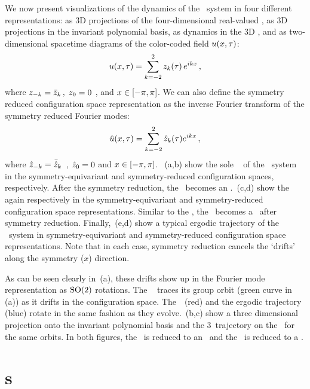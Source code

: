 \documentclass[aip,cha,
reprint,
secnumarabic,
nofootinbib, tightenlines,
nobibnotes, showkeys, showpacs,
superscriptaddress,
]{revtex4-1}
\begin{document}
We now present visualizations of the dynamics of the \twomode\ 
system in four different representations: as 3D projections of the 
four-dimensional real-valued \statesp, as 3D projections in the 
invariant polynomial basis, as dynamics in the 3D \slicePlane, 
and as two-dimensional spacetime diagrams of the color-coded field
$u(x,\tau)$:
\[
	u(x, \tau) = \sum_{k=-2}^{2} z_k(\tau) \, e^{i k x}
\,,
\]
where $z_{-k} = \bar{z}_k \,, \; 	z_0 = 0$ ,  and $x
\in [- \pi, \pi]$. We can also define the symmetry reduced configuration
space representation as the inverse Fourier transform of the symmetry
reduced Fourier modes:
\[
	\hat{u}(x, \tau) = \sum_{k=-2}^{2} \hat{z}_k(\tau) e^{i k x}
\,,
\]
where 
$\hat{z}_{-k} = \bar{\hat{z}}_k$ \,, \; 	
$\hat{z}_0 = 0$ \; 
and $x \in [- \pi, \pi]$. \,
(a,b) show the sole \reqv\ \REQV{}{} of the \twomode\ system in 
the symmetry-equivariant and symmetry-reduced configuration 
spaces, respectively. After the symmetry reduction, the \reqv\ 
becomes an \eqv. \,(c,d) show the \rpo\ 
 again respectively in the symmetry-equivariant and 
symmetry-reduced configuration space representations. Similar to 
the \reqv, the \rpo\ becomes a \po\ after symmetry reduction. 
Finally, \refFig{fig:2modes-conf}\,(e,d) show a typical ergodic 
trajectory of the \twomode\ system in symmetry-equivariant and 
symmetry-reduced configuration space representations. Note that in 
each case, symmetry reduction cancels the `drifts' along the 
symmetry ($x$) direction.

As can be seen clearly in \,(a), these 
drifts show up in the Fourier mode representation as $\textrm{SO}(2)$ 
rotations. The \reqv\ \REQV{}{} traces its  group orbit 
(green curve in \reffig{fig:2modes-ssp}\,(a)) as it drifts in the 
configuration space. The \rpo\ \cycle{01}\,(red) and the ergodic 
trajectory (blue) rotate in the same fashion as they evolve. 
\refFig{fig:2modes-ssp}\,(b,c) show a three dimensional 
projection onto the invariant polynomial basis and the 3\dmn\ 
trajectory on the \slicePlane\ for the same orbits. In both 
figures, the \reqv\ is reduced to an \eqv\ and the \rpo\ is 
reduced to a \po.

\section{\Po s}
\label{s:numerics}
\end{document}
